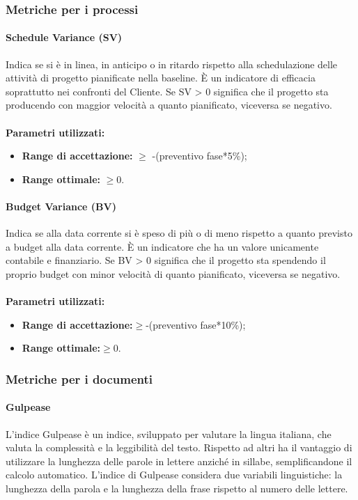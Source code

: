 \documentclass[12pt,a4paper,titlepage]{article}
\begin{document}
		\subsubsection{Metriche per i processi}
			\paragraph{Schedule Variance (SV)}
			Indica se si è in linea, in anticipo o in ritardo rispetto alla schedulazione delle attività di progetto pianificate nella baseline. È un indicatore di efficacia soprattutto nei confronti del Cliente. Se SV > 0 significa che il progetto sta producendo con maggior velocità a quanto pianificato, viceversa se negativo.
			\\ \\
			\textbf{Parametri utilizzati:}
			\begin{itemize}
				\item \textbf{Range di accettazione:} $\geq$ -(preventivo fase*5\%);
				\item \textbf{Range ottimale:} $\geq0$.
			\end{itemize}
			\paragraph{Budget Variance (BV)}
			Indica se alla data corrente si è speso di più o di meno rispetto a quanto previsto a budget alla data corrente. È un indicatore che ha un valore unicamente contabile e finanziario. Se BV > 0 significa che il progetto sta spendendo il proprio budget con minor velocità di quanto pianificato, viceversa se negativo. 
			\\ \\
			\textbf{Parametri utilizzati:}
			\begin{itemize}
				\item \textbf{Range di accettazione:}$\geq$-(preventivo fase*10\%);
				\item \textbf{Range ottimale:}$\geq0$.
			\end{itemize}
		\subsubsection{Metriche per i documenti}
			\paragraph{Gulpease}
			L'indice Gulpease è un indice, sviluppato per valutare la lingua italiana, che valuta la complessità e la leggibilità del testo. Rispetto ad altri ha il vantaggio di utilizzare la lunghezza delle parole in lettere anziché in sillabe, semplificandone il calcolo automatico. L'indice di Gulpease considera due variabili linguistiche: la lunghezza della parola e la lunghezza della frase rispetto al numero delle lettere.
			
\end{document}
